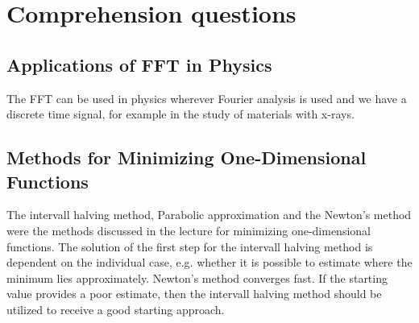 \setcounter{section}{-1}
\section{Comprehension questions}
\subsection{Applications of FFT in Physics}
The FFT can be used in physics wherever Fourier analysis is used and we have a discrete time signal, for example in the study of materials with x-rays.
\subsection{Methods for Minimizing One-Dimensional Functions}
The intervall halving method, Parabolic approximation and the Newton's method were the methods discussed in the lecture for minimizing one-dimensional functions.
The solution of the first step for the intervall halving method is dependent on the individual case, e.g. whether it is possible to estimate where the minimum
lies approximately. Newton's method converges fast. If the starting value provides a poor estimate, then the intervall halving method should be utilized to receive a good starting approach.